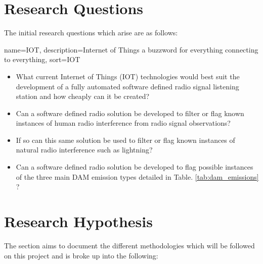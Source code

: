 \documentclass[runningheads,a4paper]{llncs}
\begin{document}
\section*{Research Questions}
The initial research questions which arise are as follows:

%
{
  name={IOT},
  description={Internet of Things a buzzword for everything connecting to everything},
  sort=IOT
}
%

\begin{itemize}
  \item What current Internet of Things (\gls{IOT}) technologies would best suit the development of a fully automated software defined radio signal listening station and how cheaply can it be created?
  \item Can a software defined radio solution be developed to filter or flag known instances of human radio interference from radio signal observations?
  \item If so can this same solution be used to filter or flag known instances of natural radio interference such as lightning?
  \item Can a software defined radio solution be developed to flag possible instances of the three main \gls{DAM} emission types detailed in Table. \ref{tab:dam_emissions} ?
\end{itemize}

%
%
\newpage
\section*{Research Hypothesis}

The section aims to document the different methodologies which will be followed on this project and is broke up into the following:
\end{document}
